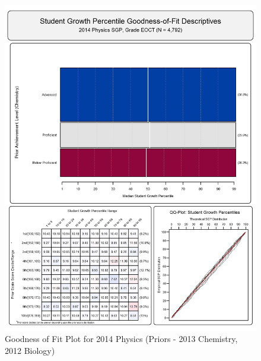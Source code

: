\documentclass[12pt]{article}
\begin{document}
\begin{figure}[htbp]
\centering
\includegraphics{../img/Goodness_of_Fit/PHYSICS.2014/2014_PHYSICS_EOCT;2013_CHEMISTRY_EOCT;2012_BIOLOGY_EOCT.png}
\caption{Goodness of Fit Plot for 2014 Physics (Priors - 2013 Chemistry,
2012 Biology)}
\end{figure}
\end{document}
